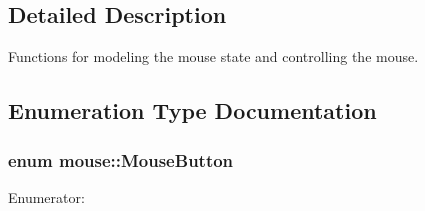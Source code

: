 \subsection{Detailed Description}
Functions for modeling the mouse state and controlling the mouse. 

\subsection{Enumeration Type Documentation}
\hypertarget{namespacemouse_a185e90053251dae588490005b1953fee}{
\subsubsection[{Mouse\-Button}]{\setlength{\rightskip}{0pt plus 5cm}enum {\bf mouse\-::\-Mouse\-Button}}}\label{namespacemouse_a185e90053251dae588490005b1953fee}
\begin{Desc}
\item[Enumerator\-: ]\par
\begin{description}
\item[{\em 
\hypertarget{namespacemouse_a185e90053251dae588490005b1953feead099c4586c3d6cf30e4d4da38bc414ca}{L\-E\-F\-T\-\_\-\-B\-U\-T\-T\-O\-N}\label{namespacemouse_a185e90053251dae588490005b1953feead099c4586c3d6cf30e4d4da38bc414ca}
}]\item[{\em 
\hypertarget{namespacemouse_a185e90053251dae588490005b1953feea9ab944e0c7a1999da316be044705f024}{R\-I\-G\-H\-T\-\_\-\-B\-U\-T\-T\-O\-N}\label{namespacemouse_a185e90053251dae588490005b1953feea9ab944e0c7a1999da316be044705f024}
}]\end{description}
\end{Desc}



